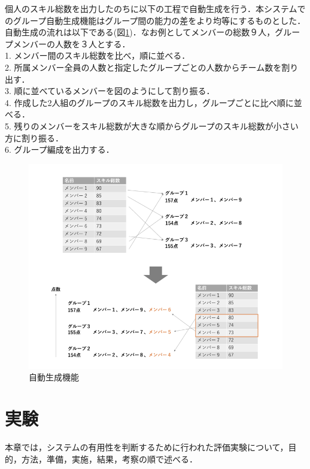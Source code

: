 \documentclass{funthesis}
\begin{document}
個人のスキル総数を出力したのちに以下の工程で自動生成を行う．本システムでのグループ自動生成機能はグループ間の能力の差をより均等にするものとした．自動生成の流れは以下である(図\ref{auto})．なお例としてメンバーの総数９人，グループメンバーの人数を３人とする．\\
 1. メンバー間のスキル総数を比べ，順に並べる．\\
 2. 所属メンバー全員の人数と指定したグループごとの人数からチーム数を割り出す．\\
 3. 順に並べているメンバーを図のようにして割り振る．\\
 4. 作成した2人組のグループのスキル総数を出力し，グループごとに比べ順に並べる．\\
 5. 残りのメンバーをスキル総数が大きな順からグループのスキル総数が小さい方に割り振る．\\
 6. グループ編成を出力する．\\
\begin{figure}[h]
 \centering
   \includegraphics[width=150mm]{figures/auto.png}
 \caption{自動生成機能}
 \label{auto}
\end{figure}





\chapter{実験}
本章では，システムの有用性を判断するために行われた評価実験について，目的，方法，準備，実施，結果，考察の順で述べる．
\end{document}
